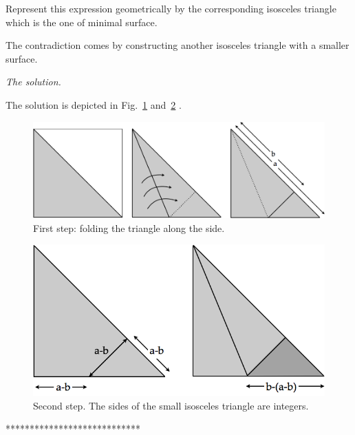 {Represent this expression geometrically by the corresponding isosceles triangle which is the one of minimal surface. 

The contradiction comes by constructing another isosceles triangle with a smaller surface.
\medskip

\noindent \textit{The solution.}

The solution is depicted in Fig.~\ref{Fig:sqrtbisInit} and~\ref{Fig:sqrtbisFin} . 
\begin{figure}
\begin{center}
        \includegraphics[scale=0.3]{FiguresArithmetic/sqrtbisInit}
        \caption{First step: folding the triangle along the side.}
        \label{Fig:sqrtbisInit}
\end{center}
\end{figure}
\begin{figure}
\begin{center}
        \includegraphics[scale=0.3]{FiguresArithmetic/sqrtbisFin}
        \caption{Second step. The sides of the small isosceles triangle are integers.}
        \label{Fig:sqrtbisFin}
\end{center}
\end{figure}
****************************}



